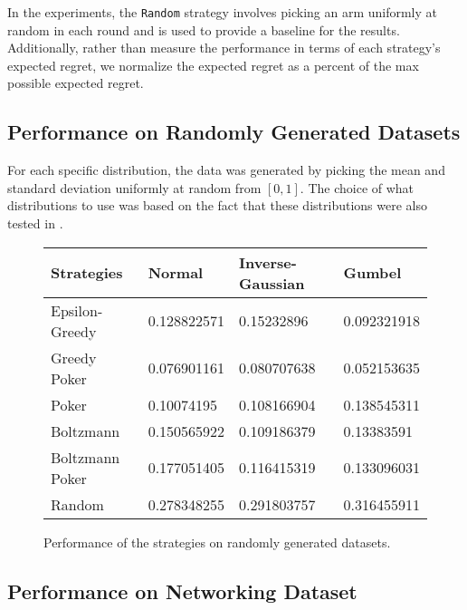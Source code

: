 \documentclass[12pt]{article}
\begin{document}
In the experiments, the \texttt{Random} strategy involves picking an arm uniformly at random in each round and is used to provide a baseline for the results.  Additionally,
rather than measure the performance in terms of each strategy's expected regret, we normalize the expected regret as a percent of the max possible expected regret. 

\subsection{Performance on Randomly Generated Datasets}
For each specific distribution, the data was generated by picking the mean and standard deviation uniformly at random from $[0,1]$.  The choice of what
distributions to use was based on the fact that these distributions were also tested in \cite{Kuleshov}. 

\begin{figure}
\begin{center}
    \begin{tabular}{| l | l | l | l |}
    \hline
    Strategies & Normal & Inverse-Gaussian & Gumbel \\ \hline
    Epsilon-Greedy & 0.128822571 & 0.15232896 & 0.092321918 \\ \hline
    Greedy Poker & 0.076901161 & 0.080707638 & 0.052153635 \\ \hline
    Poker & 0.10074195 & 0.108166904 & 0.138545311 \\ \hline
    Boltzmann & 0.150565922 & 0.109186379 & 0.13383591 \\ \hline
    Boltzmann Poker & 0.177051405 & 0.116415319 & 0.133096031 \\ \hline 
    Random & 0.278348255 & 0.291803757 & 0.316455911 \\ \hline
    \hline
    \end{tabular}
\end{center}  
\caption{Performance of the strategies on randomly generated datasets.}
\end{figure}

\subsection{Performance on Networking Dataset}
\end{document}
